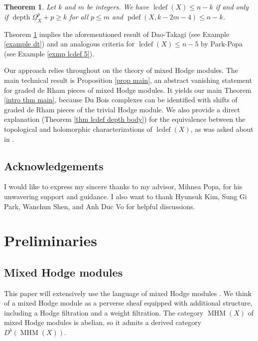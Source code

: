 \documentclass[11pt]{amsart}
\theoremstyle{definition}
\theoremstyle{plain}
\newcounter{intro}
\newtheorem{intro-theorem}[intro]{Theorem}
\DeclareMathOperator{\MHM}{MHM}
\DeclareMathOperator{\lcdef}{lcdef}
\DeclareMathOperator{\pdef}{pdef}
\DeclareMathOperator{\depth}{depth}
\begin{document}
\begin{intro-theorem}\label{intro thm pdef}
Let $k$ and $m$ be integers. We have $\lcdef(X) \leq n-k$ if and only if $\depth \underline{\Omega}_X^p + p \geq k$ for all $p \leq m$ and $\pdef(X, k-2m-4) \leq n-k$.
\end{intro-theorem}

Theorem \ref{intro thm pdef} implies the aforementioned result of Dao-Takagi (see Example \ref{example dt}) and an analogous criteria for $\lcdef(X) \leq n-5$ by Park-Popa \cite[Corollary G]{popa park lefschetz} (see Example \ref{exmp lcdef 5}). 

Our approach relies throughout on the theory of mixed Hodge modules. The main technical result is Proposition \ref{prop main}, an abstract vanishing statement for graded de Rham pieces of mixed Hodge modules. It yields our main Theorem \ref{intro thm main}, because Du Bois complexes can be identified with shifts of graded de Rham pieces of the trivial Hodge module. We also provide a direct explanation (Theorem \ref{thm lcdef depth body}) for the equivalence between the topological and holomorphic characterizations of $\lcdef(X)$, as was asked about in \cite[Remark $11.2$]{local cohomology}.



\subsection*{Acknowledgements}
I would like to express my sincere thanks to my advisor, Mihnea Popa, for his unwavering support and guidance. I also want to thank Hyunsuk Kim, Sung Gi Park, Wanchun Shen, and Anh Duc Vo for helpful discussions.





\section{Preliminaries}

\subsection{Mixed Hodge modules}
This paper will extensively use the language of mixed Hodge modules \cite{saito 88, saito 90}. We think of a mixed Hodge module as a perverse sheaf equipped with additional structure, including a Hodge filtration and a weight filtration. The category $\MHM(X)$ of mixed Hodge modules is abelian, so it admits a derived category $D^b(\MHM(X))$.
\end{document}
